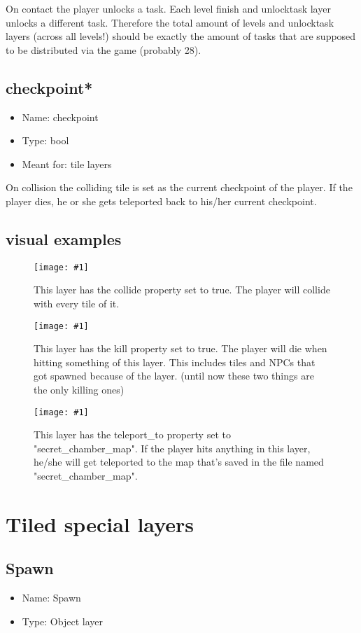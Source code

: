 \documentclass{article}
\newcommand{\erklaerbild}[2]{
	\begin{figure}[H]
		\center
		\texttt{[image: \#1]}
		\caption{#2}
	\end{figure}
}
\begin{document}
On contact the player unlocks a task. Each level finish and unlocktask layer unlocks a different task. Therefore the total amount of levels and unlocktask layers (across all levels!) should be exactly the amount of tasks that are supposed to be distributed via the game (probably 28).

\subsection{checkpoint*}
\begin{itemize}
	\item Name: checkpoint
	\item Type: bool
	\item Meant for: tile layers
\end{itemize}
On collision the colliding tile is set as the current checkpoint of the player. If the player dies, he or she gets teleported back to his/her current checkpoint.


\subsection{visual examples}

\erklaerbild
	{custom_prop_collide.png}
	{This layer has the collide property set to true. The player will collide with every tile of it.}

\erklaerbild
	{custom_prop_kill.png}
	{This layer has the kill property set to true. The player will die when hitting something of this layer. This includes tiles and NPCs that got spawned because of the layer. (until now these two things are the only killing ones)}

\erklaerbild
	{custom_prop_teleport_to.png}
	{This layer has the teleport\_to property set to "secret\_chamber\_map". If the player hits anything in this layer, he/she will get teleported to the map that's saved in the file named "secret\_chamber\_map".}

\section{Tiled special layers}
\subsection{Spawn}
\begin{itemize}
	\item Name: Spawn
	\item Type: Object layer
\end{itemize}
\end{document}
